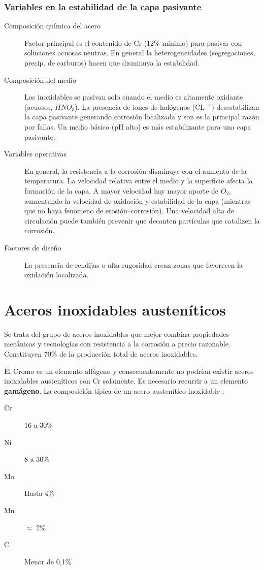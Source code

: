\subsubsection*{Variables en la estabilidad de la capa pasivante}
\begin{description}
	\item[Composición química del acero] Factor principal es el contenido de Cr (12\% mínimo) para pasivar con soluciones acuosas neutras. En general la heterogeneidades (segregaciones, precip. de carburos) hacen que disminuya la estabilidad.
	\item[Composición del medio] Los inoxidables se pasivan solo cuando el medio es altamente oxidante (acuosos, $HNO_3$). La presencia de iones de halógenos (CL$^{-1}$) desestabilizan la capa pasivante generando corrosión localizada y son es la principal razón por fallas. Un medio básico (pH alto) es más estabilizante para una capa pasivante.
	\item[Variables operativas] En general, la resistencia a la corrosión disminuye con el aumento de la temperatura. La velocidad relativa entre el medio y la superficie afecta la formación de la capa. A mayor velocidad hay mayor aporte de $O_2$, aumentando la velocidad de oxidación y estabilidad de la capa (mientras que no haya fenomeno de erosión--corrosión). Una velocidad alta de circulación puede también prevenir que decanten partículas que catalizen la corrosión.
	\item[Factores de diseño] La presencia de rendijas o alta rugosidad crean zonas que favorecen la oxidación localizada.
\end{description}

\section{Aceros inoxidables austeníticos}
Se trata del grupo de aceros inoxidables que mejor combina propiedades mecánicas y tecnologías con resistencia a la corrosión a precio razonable. Constituyen 70\% de la producción total de aceros inoxidables. 



El Cromo es un elemento alfágeno y consecuentemente no podrían existir aceros inoxidables austeníticos con Cr solamente. Es necesario recurrir a un elemento \textbf{gamágeno}. La composición típica de un acero austenítico inoxidable :
\begin{description}
	\item[Cr] 16 a 30\%
	\item[Ni] 8 a 30\%
	\item[Mo] Hasta 4\%
	\item[Mn] $\approx$ 2\%
	\item[C] Menor de 0,1\%
\end{description}

